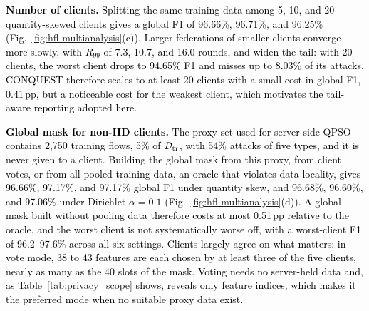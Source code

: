 \documentclass[conference]{IEEEtran}
\begin{document}
\textcolor{black}{\textbf{Number of clients.} Splitting the
same training data among 5, 10, and 20 quantity-skewed clients gives a
global F1 of 96.66\%, 96.71\%, and 96.25\%
(Fig.~\ref{fig:hfl-multianalysis}(c)). Larger federations of smaller
clients converge more slowly, with $R_{99}$ of 7.3, 10.7, and 16.0
rounds, and widen the tail: with 20 clients, the worst client drops to
94.65\% F1 and misses up to 8.03\% of its attacks. CONQUEST therefore
scales to at least 20 clients with a small cost in global F1,
0.41\,pp, but a noticeable cost for the weakest client, which
motivates the tail-aware reporting adopted here.}

\textcolor{black}{\textbf{Global mask for non-IID clients.}
The proxy set used for server-side QPSO contains 2{,}750 training
flows, 5\% of $\mathcal{D}_{\rm tr}$, with 54\% attacks of five types,
and it is never given to a client. Building the global mask from this
proxy, from client votes, or from all pooled training data, an oracle
that violates data locality, gives 96.66\%, 97.17\%, and 97.17\%
global F1 under quantity skew, and 96.68\%, 96.60\%, and 97.06\% under
Dirichlet $\alpha=0.1$ (Fig.~\ref{fig:hfl-multianalysis}(d)). A
global mask built without pooling data therefore costs at most
0.51\,pp relative to the oracle, and the worst client is not
systematically worse off, with a worst-client F1 of 96.2--97.6\%
across all six settings. Clients largely agree on what matters: in
vote mode, 38 to 43 features are each chosen by at least three of the
five clients, nearly as many as the 40 slots of the mask. Voting needs no server-held data and,
as Table~\ref{tab:privacy_scope} shows, reveals only feature indices,
which makes it the preferred mode when no suitable proxy data exist.}
\end{document}
